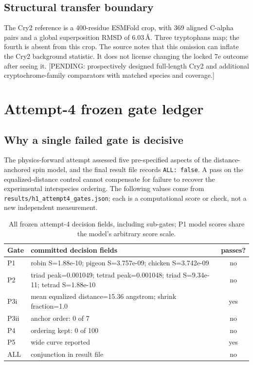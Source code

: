 \subsection{Structural transfer boundary}
The Cry2 reference is a 400-residue ESMFold crop, with 369 aligned C-alpha pairs and a global superposition RMSD of 6.03\,\AA. Three tryptophans map; the fourth is absent from this crop. The source notes that this omission can inflate the Cry2 background statistic. It does not license changing the locked 7e outcome after seeing it. [PENDING: prospectively designed full-length Cry2 and additional cryptochrome-family comparators with matched species and coverage.]

\section{Attempt-4 frozen gate ledger}
\subsection{Why a single failed gate is decisive}
The physics-forward attempt assessed five pre-specified aspects of the distance-anchored spin model, and the final result file records \texttt{ALL: false}. A pass on the equalized-distance control cannot compensate for failure to recover the experimental interspecies ordering. The following values come from \texttt{results/h1\_attempt4\_gates.json}; each is a computational score or check, not a new independent measurement.\begin{table}[!htbp]\centering\small\caption{All frozen attempt-4 decision fields, including sub-gates; P1 model scores share the model's arbitrary score scale.}\begin{tabular}{lp{8.6cm}c}\hline Gate & committed decision fields & passes? \\\hline
P1 & robin S=1.88e-10; pigeon S=3.757e-09; chicken S=3.742e-09 & no\\
P2 & triad peak=0.001049; tetrad peak=0.001048; triad S=9.34e-11; tetrad S=1.88e-10 & no\\
P3i & mean equalized distance=15.36 angstrom; shrink fraction=1.0 & yes\\
P3ii & anchor order: 0 of 7 & no\\
P4 & ordering kept: 0 of 100 & no\\
P5 & wide curve reported & yes\\
ALL & conjunction in result file & no \\\hline\end{tabular}\end{table}
